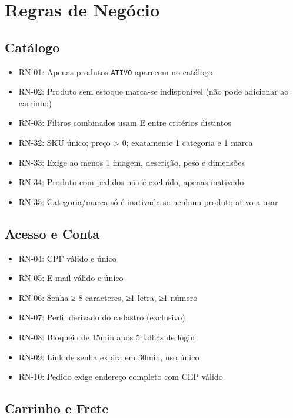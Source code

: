 \documentclass[12pt,a4paper]{article}
\providecommand{\tightlist}{%
  \setlength{\itemsep}{0pt}\setlength{\parskip}{0pt}}
\begin{document}
\section{Regras de Negócio}\label{sec:rn}

\subsection{Catálogo}

\begin{itemize}
\tightlist
\item RN-01: Apenas produtos \texttt{ATIVO} aparecem no catálogo
\item RN-02: Produto sem estoque marca-se indisponível (não pode adicionar ao carrinho)
\item RN-03: Filtros combinados usam E entre critérios distintos
\item RN-32: SKU único; preço > 0; exatamente 1 categoria e 1 marca
\item RN-33: Exige ao menos 1 imagem, descrição, peso e dimensões
\item RN-34: Produto com pedidos não é excluído, apenas inativado
\item RN-35: Categoria/marca só é inativada se nenhum produto ativo a usar
\end{itemize}

\subsection{Acesso e Conta}

\begin{itemize}
\tightlist
\item RN-04: CPF válido e único
\item RN-05: E-mail válido e único
\item RN-06: Senha ≥ 8 caracteres, ≥1 letra, ≥1 número
\item RN-07: Perfil derivado do cadastro (exclusivo)
\item RN-08: Bloqueio de 15min após 5 falhas de login
\item RN-09: Link de senha expira em 30min, uso único
\item RN-10: Pedido exige endereço completo com CEP válido
\end{itemize}

\subsection{Carrinho e Frete}
\end{document}
